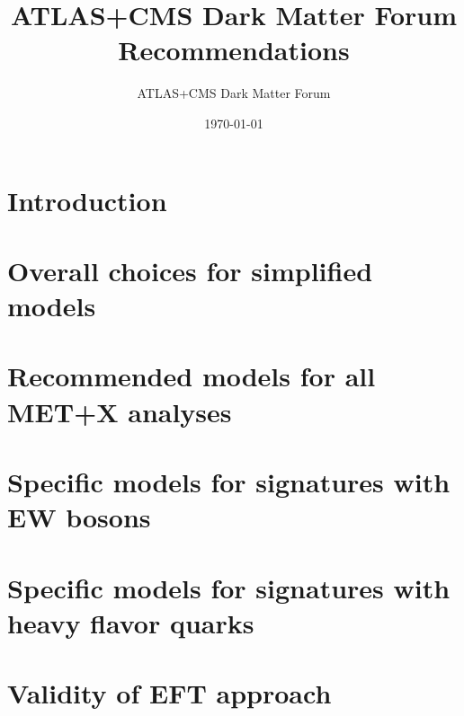 \documentclass[a4,debug,notitlepage,nobib]{tufte-book}
\title{ATLAS+CMS Dark Matter Forum Recommendations}
\author{ATLAS+CMS Dark Matter Forum}
\date{\today}
\newcommand{\blankpage}{\newpage\hbox{}\thispagestyle{empty}\newpage}
\begin{document}
\morefloats
\setcounter{secnumdepth}{3} %



\blankpage

\chapter{Introduction}
\label{sec:Introduction}


\chapter{Overall choices for simplified models}
\label{sec:SimplifiedModelsIntro} 


\chapter{Recommended models for all MET+X analyses}
\label{subsec:MonojetLikeModels}


% 

\chapter{Specific models for signatures with EW bosons}
\label{subsec:EWSpecificModels}


\chapter{Specific models for signatures with heavy flavor quarks}
\label{subsec:DMHFModels}


% 

\chapter{Validity of EFT approach}
\label{sec:EFTValidity} 

\end{document}
